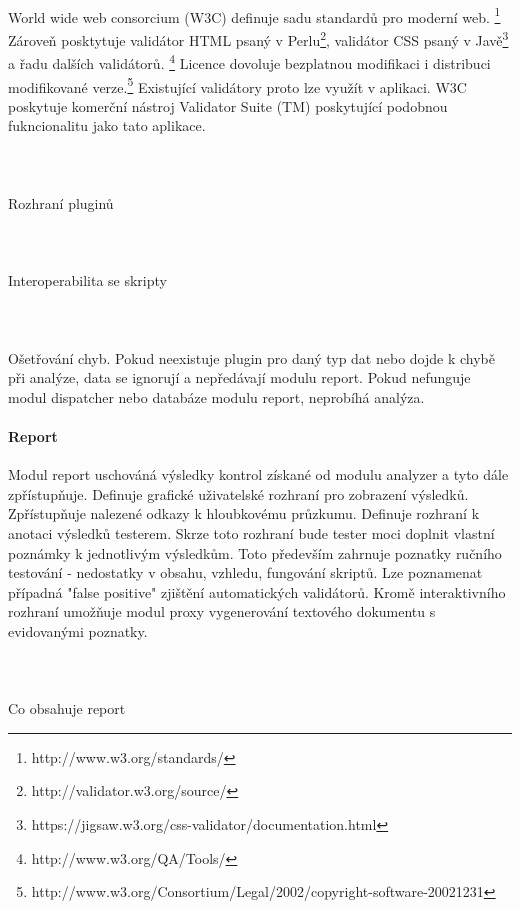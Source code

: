 \documentclass[10pt]{article}
\begin{document}
	\paragraph{~}World wide web consorcium (W3C)  definuje sadu standardů pro moderní web. \footnote{http://www.w3.org/standards/} Zároveň posktytuje validátor HTML psaný v Perlu\footnote{http://validator.w3.org/source/}, validátor CSS psaný v Javě\footnote{https://jigsaw.w3.org/css-validator/documentation.html} a řadu dalších validátorů. \footnote{http://www.w3.org/QA/Tools/} Licence dovoluje bezplatnou modifikaci i distribuci modifikované verze.\footnote{http://www.w3.org/Consortium/Legal/2002/copyright-software-20021231} Existující validátory proto lze využít v aplikaci. W3C poskytuje komerční nástroj Validator Suite (TM) poskytující podobnou fukncionalitu jako tato aplikace.
	\paragraph{~}Rozhraní pluginů
	\paragraph{~}Interoperabilita se skripty
	\paragraph{~}Ošetřování chyb. Pokud neexistuje plugin pro daný typ dat nebo dojde k chybě při analýze, data se ignorují a nepředávají modulu report. Pokud nefunguje modul dispatcher nebo databáze modulu report, neprobíhá analýza.
	\paragraph{Report} Modul report uschováná výsledky kontrol získané od modulu analyzer a tyto dále zpřístupňuje. Definuje grafické uživatelské rozhraní pro zobrazení výsledků. Zpřístupňuje nalezené odkazy k hloubkovému průzkumu. Definuje rozhraní k anotaci výsledků testerem. Skrze toto rozhraní bude tester moci doplnit vlastní poznámky k jednotlivým výsledkům. Toto především zahrnuje poznatky ručního testování - nedostatky v obsahu, vzhledu, fungování skriptů. Lze poznamenat případná "false positive" zjištění automatických validátorů. Kromě interaktivního rozhraní umožňuje modul proxy vygenerování textového dokumentu s evidovanými poznatky. 
	\paragraph{~}Co obsahuje report
\end{document}

